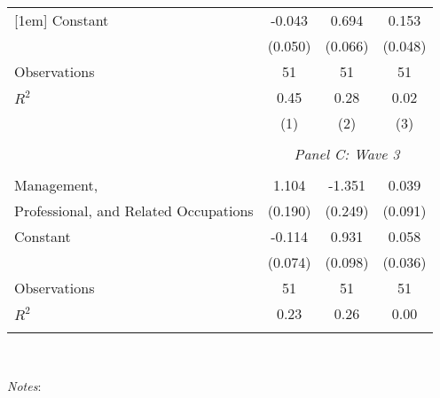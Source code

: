 \begin{table}[!htbp]
\begin{tabular}{@{\extracolsep{5pt}}lccc}
[1em]
Constant            &      -0.043         &       0.694\sym{***}&       0.153\sym{***}\\
                    &     (0.050)         &     (0.066)         &     (0.048)         \\
[1em]
Observations        &          51         &          51         &          51         \\
\(R^{2}\)           &        0.45         &        0.28         &        0.02         \\
                    &\multicolumn{1}{c}{(1)}         &\multicolumn{1}{c}{(2)}         &\multicolumn{1}{c}{(3)}         \\
\hline \\               & \multicolumn{3}{c}{\textit{Panel C: Wave 3}} \\               \addlinespace[1mm] \\
Management,         &       1.104\sym{***}&      -1.351\sym{***}&       0.039         \\
Professional, and Related Occupations&     (0.190)         &     (0.249)         &     (0.091)         \\
[1em]
Constant            &      -0.114         &       0.931\sym{***}&       0.058         \\
                    &     (0.074)         &     (0.098)         &     (0.036)         \\
[1em]
Observations        &          51         &          51         &          51         \\
\(R^{2}\)           &        0.23         &        0.26         &        0.00         \\
\hline                         \hline                          \hline \\[-1.8ex]                          \end{tabular}                         \\                         \begin{minipage}{1.0 \textwidth}                         {\footnotesize \emph{Notes}:                          \starlanguage}                         \end{minipage}                         \end{table}